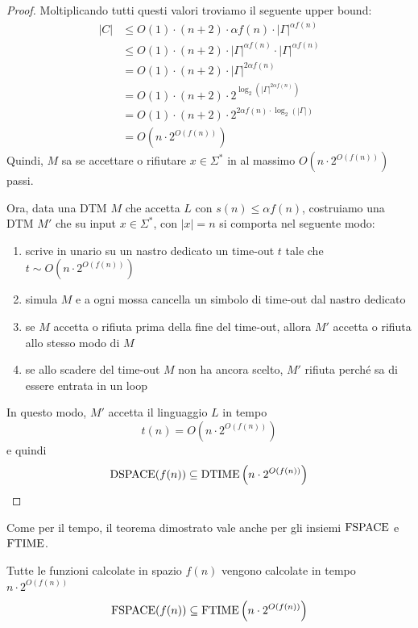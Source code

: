 \begin{proof}
	Moltiplicando tutti questi valori troviamo il seguente upper bound: 
	\begin{align*}
		|C| & \leq O(1) \cdot (n + 2) \cdot \alpha f (n) \cdot |\Gamma|^{\alpha f (n)} \\
		& \leq O(1) \cdot (n + 2) \cdot |\Gamma|^{\alpha f(n)} \cdot |\Gamma|^{\alpha f(n)} \\
		& = O(1) \cdot (n + 2) \cdot |\Gamma|^{2 \alpha f (n)} \\
		& = O(1) \cdot (n + 2) \cdot 2^{\log_2 \left(|\Gamma|^{2 \alpha f(n)}\right)} \\
		& = O(1) \cdot (n + 2) \cdot 2^{2 \alpha f(n) \cdot \log_2 \left(|\Gamma|\right)} \\
		& = O \left(n \cdot 2^{O(f(n))}\right)
	\end{align*}
	Quindi, $M$ sa se accettare o rifiutare $x \in \Sigma^\ast$ in al massimo $O\left(n \cdot 2^{O(f(n))}\right)$ passi.
	
	Ora, data una DTM $M$ che accetta $L$ con $s(n) \leq \alpha f(n)$, costruiamo una DTM $M'$ che su input $x \in \Sigma^\ast$, con $|x| = n$ si comporta nel seguente modo:
	\begin{enumerate}
		\item scrive in unario su un nastro dedicato un time-out $t$ tale che $t \sim O\left(n \cdot 2^{O(f(n))}\right)$
		\item simula $M$ e a ogni mossa cancella un simbolo di time-out dal nastro dedicato
		\item se $M$ accetta o rifiuta prima della fine del time-out, allora $M'$ accetta o rifiuta allo stesso modo di $M$
		\item se allo scadere del time-out $M$ non ha ancora scelto, $M'$ rifiuta perché sa di essere entrata in un loop
	\end{enumerate} 
	
	In questo modo, $M'$ accetta il linguaggio $L$ in tempo
	$$ t(n) = O \left(n \cdot 2^{O(f(n))}\right) $$
	e quindi 
	$$ \text{DSPACE}(f(n)) \subseteq \text{DTIME} \left(n \cdot 2^{O(f(n))}\right) $$
\end{proof}

Come per il tempo, il teorema dimostrato vale anche per gli insiemi $\text{FSPACE}$ e $\text{FTIME}$.\\

\begin{theor}
	Tutte le funzioni calcolate in spazio $f(n)$ vengono calcolate in tempo $n \cdot 2^{O(f(n))}$
	$$ \text{FSPACE} (f(n)) \subseteq \text{FTIME} \left(n \cdot 2^{O(f(n))}\right)$$
\end{theor}

